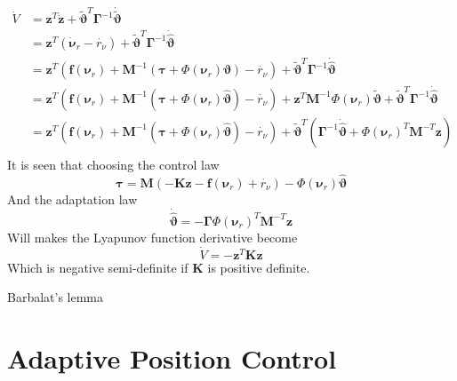 \documentclass[12pt,a4]{article}
\begin{document}
\begin{align}
	\dot{V} & = \bm{z}^T\dot{\bm{z}}
	+ \bm{\tilde{\vartheta}} ^T\bm{\Gamma}^{-1}\bm{\dot{\tilde{\vartheta}}}                                                                         \\
	        & = \bm{z}^T\left(\bm{\dot{\nu}}_r  - \dot{r_{\nu}}\right)
	+ \bm{\tilde{\vartheta}} ^T\bm{\Gamma}^{-1}\bm{\dot{\hat{\vartheta}}}                                                                           \\
	        & = \bm{z}^T\left(\bm{f}(\bm{\nu}_r) + \bm{M}^{-1}\left(\bm{\tau} + \Phi(\bm{\nu}_r )\bm{\vartheta}\right)  - \dot{r_{\nu}}\right)
	+ \bm{\tilde{\vartheta}} ^T\bm{\Gamma}^{-1}\bm{\dot{\hat{\vartheta}}}                                                                           \\
	        & = \bm{z}^T\left(\bm{f}(\bm{\nu}_r) + \bm{M}^{-1}\left(\bm{\tau} + \Phi(\bm{\nu}_r )\bm{\hat{\vartheta}}\right) - \dot{r_{\nu}}\right)
	+ \bm{z}^T\bm{M}^{-1} \Phi(\bm{\nu}_r )\bm{\tilde{\vartheta}}
	+ \bm{\tilde{\vartheta}} ^T\bm{\Gamma}^{-1}\bm{\dot{\hat{\vartheta}}}                                                                           \\
	        & = \bm{z}^T\left(\bm{f}(\bm{\nu}_r) + \bm{M}^{-1}\left(\bm{\tau} + \Phi(\bm{\nu}_r )\bm{\hat{\vartheta}}\right) - \dot{r_{\nu}}\right)
	+ \bm{\tilde{\vartheta}}^T \left(\bm{\Gamma}^{-1}\bm{\dot{\hat{\vartheta}}} +\Phi(\bm{\nu}_r )^T \bm{M}^{-T} \bm{z} \right)                     \\
\end{align}
It is seen that choosing the control law
\begin{equation}
	\bm{\tau} = \bm{M} \left( -\bm{K}\bm{z} -\bm{f}(\bm{\nu}_r) +\dot{r_{\nu}} \right) -\Phi(\bm{\nu}_r )\bm{\hat{\vartheta}}
\end{equation}
And the adaptation law
\begin{equation}
	\bm{\dot{\hat{\vartheta}}} = - \bm{\Gamma} \Phi(\bm{\nu}_r )^T \bm{M}^{-T} \bm{z}
\end{equation}
Will makes the Lyapunov function derivative become
\begin{equation}
	\dot{V} = -\bm{z}^T \bm{K} \bm{z}
\end{equation}
Which is negative semi-definite if $\bm{K}$ is positive definite.

Barbalat’s lemma

\section{Adaptive Position Control}
\end{document}

